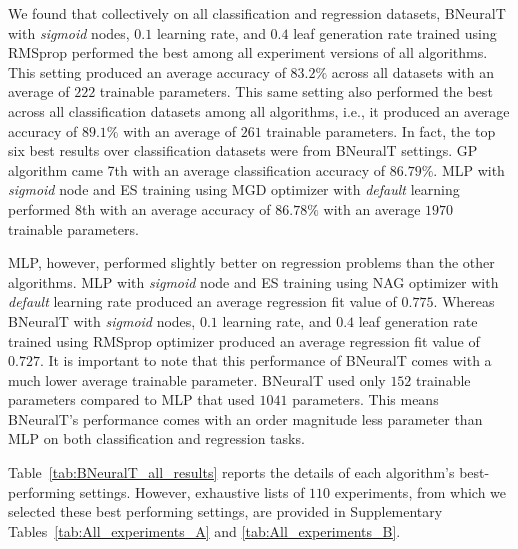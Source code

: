 \documentclass[11pt,a4paper]{article}
\begin{document}
    We found that collectively on all classification and regression datasets, BNeuralT with \textit{sigmoid} nodes, $0.1$ learning rate, and $0.4$ leaf generation rate trained using RMSprop  performed the best among all experiment versions of all algorithms. This setting produced an average accuracy of $83.2\%$ across all datasets with an average of $222$ trainable parameters. This same setting also performed the best across all classification datasets among all algorithms, i.e., it produced an average accuracy of $89.1\%$ with an average of $261$ trainable parameters.  In fact, the top six best results over classification datasets were from BNeuralT settings. GP algorithm came 7th with an average classification accuracy of $86.79\%$. MLP with \textit{sigmoid} node and ES  training using MGD optimizer with \textit{default} learning performed 8th with an average accuracy of $86.78\%$ with an average $1970$ trainable parameters.
    
    MLP, however, performed slightly better on regression problems than the other algorithms. MLP with \textit{sigmoid} node and ES training using NAG optimizer with \textit{default} learning rate produced an average regression fit value of $0.775$. Whereas BNeuralT with \textit{sigmoid} nodes, $0.1$ learning rate, and $0.4$ leaf generation rate trained using RMSprop optimizer produced an average regression fit value of $0.727$. It is important to note that this performance of BNeuralT comes with a much lower average trainable parameter. BNeuralT used only $152$ trainable parameters compared to MLP that used $1041$ parameters. This means BNeuralT's performance comes with an order magnitude less parameter than MLP on both classification and regression tasks.
    
    Table~\ref{tab:BNeuralT_all_results} reports the details of each algorithm's best-performing settings. However, exhaustive lists of $110$ experiments, from which we selected these best performing settings, are provided in Supplementary Tables~\ref{tab:All_experiments_A} and \ref{tab:All_experiments_B}. 
    
\end{document}
